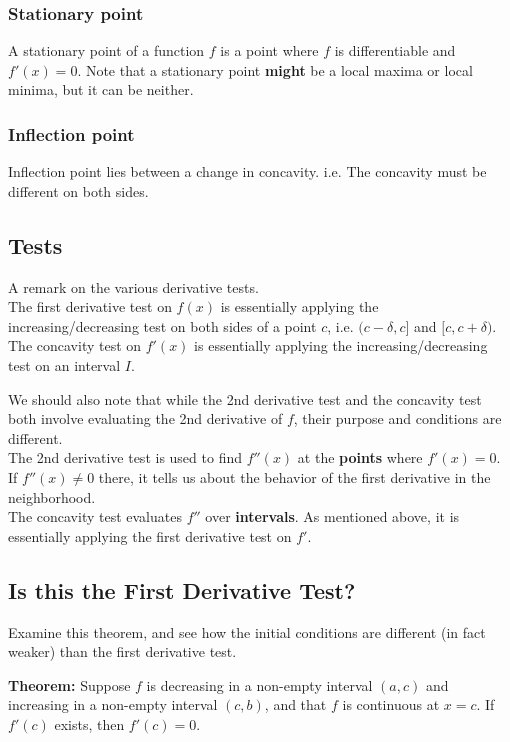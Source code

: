 \documentclass{article}
\begin{document}
\subsubsection{Stationary point}
A stationary point of a function $f$ is a point where $f$ is differentiable and $f'(x)=0$. Note that a stationary point \textbf{might} be a local maxima or local minima, but it can be neither.

\subsubsection{Inflection point}
Inflection point lies between a change in concavity. i.e. The concavity must be different on both sides.

\subsection{Tests}
A remark on the various derivative tests.\\
The first derivative test on $f(x)$ is essentially applying the increasing/decreasing test on both sides of a point $c$, i.e. $(c-\delta,c]$ and $[c, c+\delta)$.\\
The concavity test on $f'(x)$ is essentially applying the increasing/decreasing test on an interval $I$.

We should also note that while the 2nd derivative test and the concavity test both involve evaluating the 2nd derivative of $f$, their purpose and conditions are different.\\
The 2nd derivative test is used to find $f''(x)$ at the \textbf{points} where $f'(x)=0$. If $f''(x)\neq 0$ there, it tells us about the behavior of the first derivative in the neighborhood.\\
The concavity test evaluates $f''$ over \textbf{intervals}. As mentioned above, it is essentially applying the first derivative test on $f'$.

\subsection{Is this the First Derivative Test?}
Examine this theorem, and see how the initial conditions are different (in fact weaker) than the first derivative test.

\textbf{Theorem:} Suppose $f$ is decreasing in a non-empty interval $(a,c)$ and increasing in a non-empty interval $(c,b)$, and that $f$ is continuous at $x=c$. If $f'(c)$ exists, then $f'(c)=0$.
\end{document}
